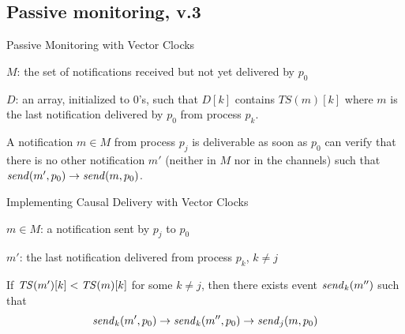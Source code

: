 \subsection{Passive monitoring, v.3}





\begin{frame}{Passive Monitoring with Vector Clocks}
	

\BI
\item $M$: the set of notifications received but not yet delivered by $p_0$
\item $D$: an array, initialized to 0's, such that $D[k]$ contains $TS(m)[k]$ where $m$
  is the last notification delivered by $p_0$ from process $p_k$.
\EI

\bigskip
{}

A notification  $m \in M$ from process $p_j$ is deliverable as soon as $p_0$
can verify that there is no other notification  $m'$ (neither in $M$ nor in the 
channels) such that $\mathit{send}(m',p_0) \rightarrow \mathit{send}(m,p_0)$.

\end{frame}


\begin{frame}{Implementing Causal Delivery with Vector Clocks}

\BI
\item $m \in M$: a notification sent by $p_j$ to $p_0$
\item $m'$: the last notification  delivered from process $p_k$, $k \neq j$
\EI

\bigskip
\begin{definition}
If $\mathit{TS}(m')[k] < \mathit{TS}(m)[k]$ for some $k \neq j$, then there exists event $\mathit{send}_k(m'')$ such that
\[
  \mathit{send}_k(m',p_0) \rightarrow \mathit{send}_k(m'',p_0) \rightarrow \mathit{send}_j(m,p_0)
\]
\end{definition}

\bigskip
\end{frame}



